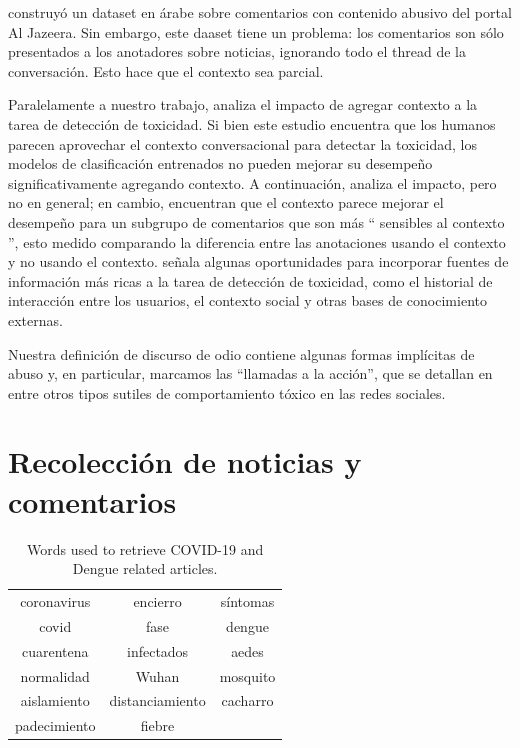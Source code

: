 \citet{mubarak-etal-2017-abusive} construyó un dataset en árabe sobre comentarios con contenido abusivo del portal Al Jazeera. Sin embargo, este daaset tiene un problema: los comentarios son sólo presentados a los anotadores sobre noticias, ignorando todo el thread de la conversación. Esto hace que el contexto sea parcial.


Paralelamente a nuestro trabajo, \citet{pavlopoulos2020toxicity} analiza el impacto de agregar contexto a la tarea de detección de toxicidad. Si bien este estudio encuentra que los humanos parecen aprovechar el contexto conversacional para detectar la toxicidad, los modelos de clasificación entrenados no pueden mejorar su desempeño significativamente agregando contexto. A continuación, \citet{xenos-2021-context} analiza el impacto, pero no en general; en cambio, encuentran que el contexto parece mejorar el desempeño para un subgrupo de comentarios que son más `` sensibles al contexto '', esto medido comparando la diferencia entre las anotaciones usando el contexto y no usando el contexto. \citet{sheth2021defining} señala algunas oportunidades para incorporar fuentes de información más ricas a la tarea de detección de toxicidad, como el historial de interacción entre los usuarios, el contexto social y otras bases de conocimiento externas.

Nuestra definición de discurso de odio contiene algunas formas implícitas de abuso y, en particular, marcamos las ``llamadas a la acción'', que se detallan en \citet{wiegand2021implicitly} entre otros tipos sutiles de comportamiento tóxico en las redes sociales.

\section{Recolección de noticias y comentarios}

\begin{table}[t]
    \centering
    \begin{tabular}{ c|c|c }
        coronavirus  &  encierro          & síntomas \\
        covid        &  fase              & dengue   \\
        cuarentena   &  infectados        & aedes    \\
        normalidad   &  Wuhan             & mosquito \\
        aislamiento  &  distanciamiento   & cacharro \\
        padecimiento &  fiebre            &          \\
    \end{tabular}
    \caption{Words used to retrieve COVID-19 and Dengue related articles.\label{tab:article_words}}
\end{table}


